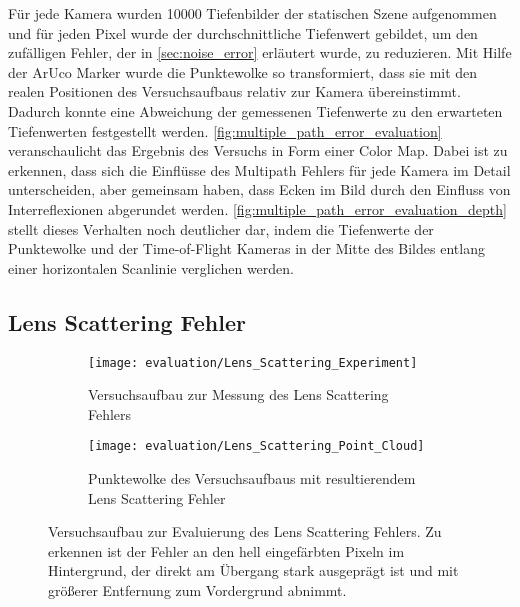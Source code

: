 \documentclass[thesis.tex]{subfiles}
\begin{document}
Für jede Kamera wurden 10000 Tiefenbilder der statischen Szene aufgenommen und für jeden Pixel wurde der durchschnittliche Tiefenwert gebildet, um den zufälligen Fehler, der in \autoref{sec:noise_error} erläutert wurde, zu reduzieren. Mit Hilfe der ArUco Marker wurde die Punktewolke so transformiert, dass sie mit den realen Positionen des Versuchsaufbaus relativ zur Kamera übereinstimmt. Dadurch konnte eine Abweichung der gemessenen Tiefenwerte zu den erwarteten Tiefenwerten festgestellt werden. \autoref{fig:multiple_path_error_evaluation} veranschaulicht das Ergebnis des Versuchs in Form einer Color Map. Dabei ist zu erkennen, dass sich die Einflüsse des Multipath Fehlers für jede Kamera im Detail unterscheiden, aber gemeinsam haben, dass Ecken im Bild durch den Einfluss von Interreflexionen abgerundet werden. \autoref{fig:multiple_path_error_evaluation_depth} stellt dieses Verhalten noch deutlicher dar, indem die Tiefenwerte der Punktewolke und der Time-of-Flight Kameras in der Mitte des Bildes entlang einer horizontalen Scanlinie verglichen werden. 
%
\subsection{Lens Scattering Fehler}\label{sec:lens_scattering}
%
\begin{figure}[h!]
\centering
\begin{subfigure}[b]{0.49\textwidth}\texttt{[image: evaluation/Lens\_Scattering\_Experiment]}
    \caption{Versuchsaufbau zur Messung des Lens Scattering Fehlers}
\end{subfigure}
\begin{subfigure}[b]{0.49\textwidth}\texttt{[image: evaluation/Lens\_Scattering\_Point\_Cloud]}
    \caption{Punktewolke des Versuchsaufbaus mit resultierendem Lens Scattering Fehler}
\end{subfigure}
\caption{Versuchsaufbau zur Evaluierung des Lens Scattering Fehlers. Zu erkennen ist der Fehler an den hell eingefärbten Pixeln im Hintergrund, der direkt am Übergang stark ausgeprägt ist und mit größerer Entfernung zum Vordergrund abnimmt.}
\label{fig:lens_scattering_experiment}
\end{figure}
\end{document}

